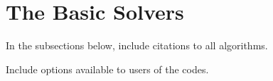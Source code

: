 \section{The Basic Solvers}

{\sf In the subsections below, include citations to all
algorithms.}

{\sf Include options available to users of the codes.}